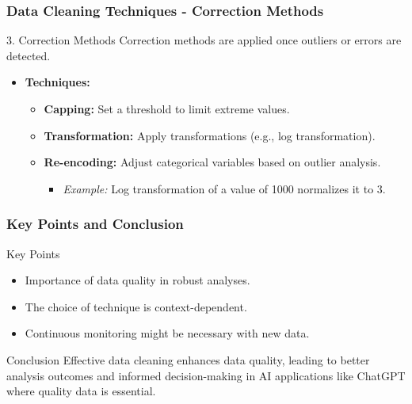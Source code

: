 \documentclass[aspectratio=169]{beamer}
\begin{document}
\begin{frame}[fragile]
    \frametitle{Data Cleaning Techniques - Correction Methods}
    \begin{block}{3. Correction Methods}
        Correction methods are applied once outliers or errors are detected.
        \begin{itemize}
            \item \textbf{Techniques:}
                \begin{itemize}
                    \item \textbf{Capping:} Set a threshold to limit extreme values.
                    \item \textbf{Transformation:} Apply transformations (e.g., log transformation).
                    \item \textbf{Re-encoding:} Adjust categorical variables based on outlier analysis.
                        \begin{itemize}
                            \item \textit{Example:} Log transformation of a value of 1000 normalizes it to 3.
                        \end{itemize}
                \end{itemize}
        \end{itemize}
    \end{block}
\end{frame}

\begin{frame}[fragile]
    \frametitle{Key Points and Conclusion}
    \begin{block}{Key Points}
        \begin{itemize}
            \item Importance of data quality in robust analyses.
            \item The choice of technique is context-dependent.
            \item Continuous monitoring might be necessary with new data.
        \end{itemize}
    \end{block}

    \begin{block}{Conclusion}
        Effective data cleaning enhances data quality, leading to better analysis outcomes and informed decision-making in AI applications like ChatGPT where quality data is essential.
    \end{block}
\end{frame}
\end{document}

